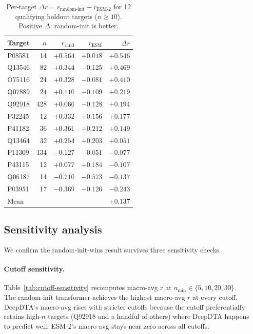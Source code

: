 \documentclass[11pt,a4paper]{article}
\begin{document}
\begin{table}[h]
\centering
\caption{Per-target $\Delta r = r_\text{random-init} - r_\text{ESM-2}$ for
12 qualifying holdout targets ($n \geq 10$). Positive $\Delta$: random-init
is better.}
\label{tab:per-target-delta}
\small
\begin{tabular}{lrrrr}
\toprule
\textbf{Target} & \textbf{$n$} & \textbf{$r_\text{rand}$} & \textbf{$r_\text{ESM}$} & \textbf{$\Delta r$} \\
\midrule
P08581  & 14  & $+0.564$ & $+0.018$ & $\mathbf{+0.546}$ \\
Q13546  & 82  & $+0.344$ & $-0.125$ & $\mathbf{+0.469}$ \\
O75116  & 24  & $+0.328$ & $-0.081$ & $\mathbf{+0.410}$ \\
Q07889  & 24  & $+0.110$ & $-0.109$ & $\mathbf{+0.219}$ \\
Q92918  & 428 & $+0.066$ & $-0.128$ & $\mathbf{+0.194}$ \\
P32245  & 12  & $+0.332$ & $+0.156$ & $\mathbf{+0.177}$ \\
P41182  & 36  & $+0.361$ & $+0.212$ & $\mathbf{+0.149}$ \\
Q13464  & 32  & $+0.254$ & $+0.203$ & $\mathbf{+0.051}$ \\
P11309  & 134 & $-0.127$ & $-0.051$ & $-0.077$ \\
P43115  & 12  & $+0.077$ & $+0.184$ & $-0.107$ \\
Q06187  & 14  & $-0.710$ & $-0.573$ & $-0.137$ \\
P03951  & 17  & $-0.369$ & $-0.126$ & $-0.243$ \\
\midrule
Mean    &     &          &          & $\mathbf{+0.137}$ \\
\bottomrule
\end{tabular}
\end{table}

\subsection{Sensitivity analysis}
\label{sec:sensitivity}

We confirm the random-init-wins result survives three sensitivity checks.

\paragraph{Cutoff sensitivity.}
Table~\ref{tab:cutoff-sensitivity} recomputes macro-avg $r$ at
$n_\text{min} \in \{5, 10, 20, 30\}$.
The random-init transformer achieves the highest macro-avg $r$ at every
cutoff.
DeepDTA's macro-avg rises with stricter cutoffs because the cutoff
preferentially retains high-$n$ targets (Q92918 and a handful of others) where
DeepDTA happens to predict well.
ESM-2's macro-avg stays near zero across all cutoffs.
\end{document}
